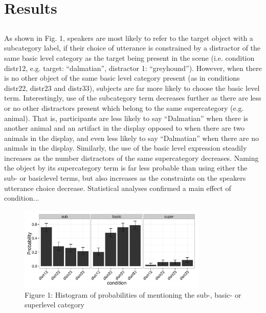 \documentclass[10pt,letterpaper]{article}
\begin{document}
\section{\bf Results}

\subsection{}
As shown in Fig. 1, speakers are most  likely to refer to the target object with a subcategory label, if their choice of utterance is constrained by a distractor of the same basic level category as the target being present in the scene (i.e. condition distr12, e.g. target: “dalmatian”, distractor 1: “greyhound”). However, when there is no other object of the same basic level category present (as in conditions distr22, distr23 and distr33), subjects are far more likely to choose the basic level term. Interestingly, use of the subcategory term decreases further as there are less or no other distractors present which belong to the same supercategory (e.g. animal). That is, participants are less likely to say “Dalmatian” when there is another animal and an artifact in the display opposed to when there are two animals in the display, and even less likely to say “Dalmatian” when there are no animals in the display. Similarly, the use of the basic level expression steadily increases as the number distractors of the same supercategory decreases. Naming the object by its supercategory term is far less probable than using either the sub- or basiclevel terms, but also increases as the constraints on the speakers utterance choice decrease. Statistical analyses confirmed a main effect of condition...

\begin{figure}[ht!]
\centering
\includegraphics[width=90mm]{graphs/proportion_mentioned_features.pdf}
\caption{Figure 1: Histogram of probabilities of mentioning the sub-, basic- or superlevel category \label{overflow}}
\end{figure}
\end{document}
